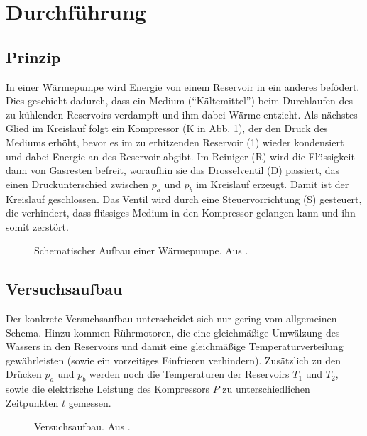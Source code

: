 \section{Durchführung}
\label{sec:Durchführung}
\subsection{Prinzip}
In einer Wärmepumpe wird Energie von einem Reservoir in ein anderes befödert. Dies geschieht dadurch, dass ein Medium (\enquote{Kältemittel}) beim Durchlaufen des zu kühlenden Reservoirs verdampft und ihm dabei Wärme entzieht. Als nächstes Glied im Kreislauf folgt ein Kompressor (K in Abb. \ref{fig:wärmepumpe}), der den Druck des Mediums erhöht, bevor es im zu erhitzenden Reservoir (1) wieder kondensiert und dabei Energie an des Reservoir abgibt. Im Reiniger (R) wird die Flüssigkeit dann von Gasresten befreit, woraufhin sie das Drosselventil (D) passiert, das einen Druckunterschied zwischen $p_a$ und $p_b$ im Kreislauf erzeugt. Damit ist der Kreislauf geschlossen. Das Ventil wird durch eine Steuervorrichtung (S) gesteuert, die verhindert, dass flüssiges Medium in den Kompressor gelangen kann und ihn somit zerstört.

\begin{figure}
  \centering
  \def\svgwidth{\columnwidth}
  
  \caption{Schematischer Aufbau einer Wärmepumpe. Aus \cite{anleitung206}.}
  \label{fig:wärmepumpe}
\end{figure}

\subsection{Versuchsaufbau}
Der konkrete Versuchsaufbau unterscheidet sich nur gering vom allgemeinen Schema. Hinzu kommen Rührmotoren, die eine gleichmäßige Umwälzung des Wassers in den Reservoirs und damit eine gleichmäßige Temperaturverteilung gewährleisten (sowie ein vorzeitiges Einfrieren verhindern). Zusätzlich zu den Drücken $p_a$ und $p_b$ werden noch die Temperaturen der Reservoirs $T_{1}$ und $T_{2}$, sowie die elektrische Leistung des Kompressors $P$ zu unterschiedlichen Zeitpunkten $t$ gemessen.

\begin{figure}
  \centering
  
  \caption{Versuchsaufbau. Aus \cite{anleitung206}.}
  \label{fig:aufbau}
\end{figure}
